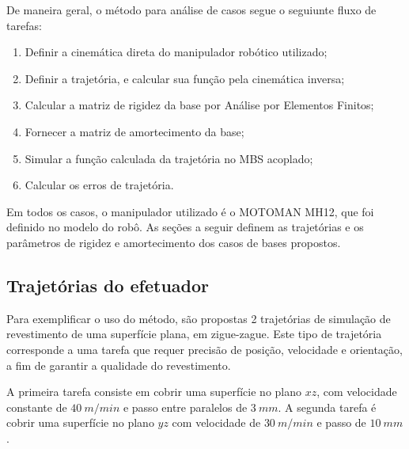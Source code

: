 De maneira geral, o método para análise de casos segue o seguiunte fluxo de
tarefas:
%
\begin{enumerate}
  \item Definir a cinemática direta do manipulador robótico utilizado;
  \item Definir a trajetória, e calcular sua função pela cinemática inversa;
  \item Calcular a matriz de rigidez da base por Análise por Elementos Finitos;
  \item Fornecer a matriz de amortecimento da base;
  \item Simular a função calculada da trajetória no MBS acoplado;
  \item Calcular os erros de trajetória.
\end{enumerate}

Em todos os casos, o manipulador utilizado é o MOTOMAN MH12, que foi definido
no modelo do robô. As seções a seguir definem as trajetórias e os parâmetros
de rigidez e amortecimento dos casos de bases propostos.

\subsection{Trajetórias do efetuador}

Para exemplificar o uso do método, são propostas 2 trajetórias de simulação de
revestimento de uma superfície plana, em zigue-zague. Este tipo de trajetória
corresponde a uma tarefa que requer precisão de posição, velocidade e
orientação, a fim de garantir a qualidade do revestimento.

A primeira tarefa consiste em cobrir uma superfície no plano $xz$, com
velocidade constante de $40~m/min$ e passo entre paralelos de $3~mm$. A segunda
tarefa é cobrir uma superfície no plano $yz$ com velocidade de $30~m/min$ e
passo de $10~mm$.

